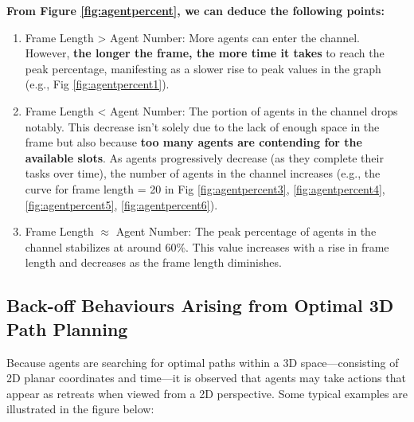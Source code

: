 \textbf{From Figure \ref{fig:agentpercent}, we can deduce the following points:}
\begin{enumerate}
    \item 
    Frame Length > Agent Number: More agents can enter the channel. However, \textbf{the longer the frame, the more time it takes} to reach the peak percentage, manifesting as a slower rise to peak values in the graph (e.g., Fig \ref{fig:agentpercent1}).
    \item 
    Frame Length < Agent Number: The portion of agents in the channel drops notably. This decrease isn't solely due to the lack of enough space in the frame but also because \textbf{too many agents are contending for the available slots}. As agents progressively decrease (as they complete their tasks over time), the number of agents in the channel increases (e.g., the curve for frame length = 20 in Fig \ref{fig:agentpercent3}, \ref{fig:agentpercent4}, \ref{fig:agentpercent5}, \ref{fig:agentpercent6}).
    \item 
    Frame Length $\approx$ Agent Number: The peak percentage of agents in the channel stabilizes at around 60\%. This value increases with a rise in frame length and decreases as the frame length diminishes.
\end{enumerate}    
\FloatBarrier

\subsection{Back-off Behaviours Arising from Optimal 3D Path Planning}

Because agents are searching for optimal paths within a 3D space—consisting of 2D planar coordinates and time—it is observed that agents may take actions that appear as retreats when viewed from a 2D perspective. Some typical examples are illustrated in the figure below:

